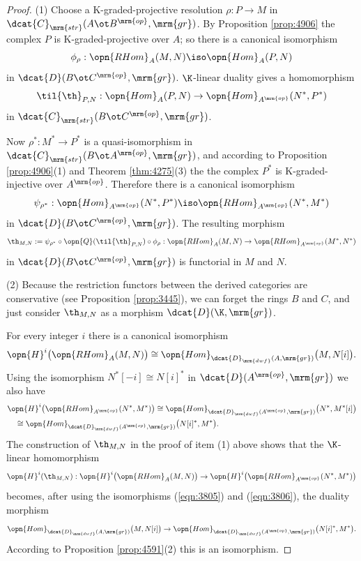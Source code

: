 \begin{proof} \mbox{}

\smallskip \noindent
(1) Choose a K-graded-projective resolution $\rho : P \to M$ in 
$\dcat{C}_{\mrm{str}}(A \ot B^{\mrm{op}}, \mrm{gr})$. 
By Proposition \ref{prop:4906} the complex $P$ is 
K-graded-projective over $A$; so there is a canonical isomorphism 
\[ \phi_{\rho} : \opn{RHom}_A(M, N) \iso \opn{Hom}_A(P, N) \]
in $\dcat{D}(B \ot C^{\mrm{op}}, \mrm{gr})$. 
$\K$-linear duality gives a homomorphism
\[ \til{\th}_{P, N} : \opn{Hom}_A(P, N) \to 
\opn{Hom}_{A^{\mrm{op}}}(N^*, P^*) \]
in $\dcat{C}_{\mrm{str}}(B \ot C^{\mrm{op}}, \mrm{gr})$.

Now $\rho^* : M^* \to P^*$ is a quasi-isomorphism
in $\dcat{C}_{\mrm{str}}(B \ot A^{\mrm{op}}, \mrm{gr})$,
and according to Proposition \ref{prop:4906}(1) and 
Theorem \ref{thm:4275}(3) the the complex $P^*$ is 
K-graded-injective over $A^{\mrm{op}}$. Therefore there is a canonical 
isomorphism 
\[ \psi_{\rho^*} : \opn{Hom}_{A^{\mrm{op}}}(N^*, P^*) \iso 
\opn{RHom}_{A^{\mrm{op}}}(N^*, M^*) \]
in $\dcat{D}(B \ot C^{\mrm{op}}, \mrm{gr})$. 
The resulting morphism 
\[ \th_{M, N} := \psi_{\rho^*} \circ \opn{Q}(\til{\th}_{P, N}) \circ \phi_{\rho}
: \opn{RHom}_A(M, N) \to \opn{RHom}_{A^{\mrm{op}}}(M^*, N^*) \]
in $\dcat{D}(B \ot C^{\mrm{op}}, \mrm{gr})$ is functorial in $M$ and $N$.

\medskip \noindent
(2) Because the restriction functors between the derived categories are 
conservative (see Proposition \ref{prop:3445}), 
we can forget the rings $B$ and $C$, and just consider 
$\th_{M, N}$ as a morphism $\dcat{D}(\K, \mrm{gr})$. 

For every integer $i$ there is a canonical isomorphism
\begin{equation} \label{eqn:3805}
\opn{H}^i \bigl( \opn{RHom}_A(M, N) \bigr)  
\cong \opn{Hom}_{\dcat{D}_{\mrm{dwf}}( A, \mrm{gr})}
\bigl( M, N[i] \bigr) .
\end{equation}
Using the isomorphism 
$N^*[-i] \cong N[i]^*$ in 
$\dcat{D}(A^{\mrm{op}}, \mrm{gr})$ we also have  
\begin{equation} \label{eqn:3806}
\begin{aligned}
& \opn{H}^i \bigl( \opn{RHom}_{A^{\mrm{op}}}(N^*, M^*) \bigr) \cong 
\opn{Hom}_{\dcat{D}_{\mrm{dwf}}(A^{\mrm{op}}, \mrm{gr})}
\bigl( N^*, M^*[i] \bigr)
\\
& \quad \cong
\opn{Hom}_{\dcat{D}_{\mrm{dwf}}(A^{\mrm{op}}, \mrm{gr})}
\bigl( N[i]^*, M^* \bigr) . 
\end{aligned}
\end{equation}
The construction of $\th_{M, N}$ in the proof of item (1) above shows that the 
$\K$-linear homomorphism 
\[ \opn{H}^i(\th_{M, N}) :  \opn{H}^i \bigl( \opn{RHom}_A(M, N) \bigr) \to
\opn{H}^i \bigl( \opn{RHom}_{A^{\mrm{op}}}(N^*, M^*) \bigr) \]
becomes, after using the isomorphisms (\ref{eqn:3805}) and 
(\ref{eqn:3806}), the duality morphism 
\[ \opn{Hom}_{\dcat{D}_{\mrm{dwf}}(A, \mrm{gr})}
\bigl( M, N[i] \bigr)  \to  
\opn{Hom}_{\dcat{D}_{\mrm{dwf}}(A^{\mrm{op}}, \mrm{gr})}
\bigl( N[i]^*, M^* \bigr) . \]
According to Proposition \ref{prop:4591}(2) this is an isomorphism.
\end{proof}

